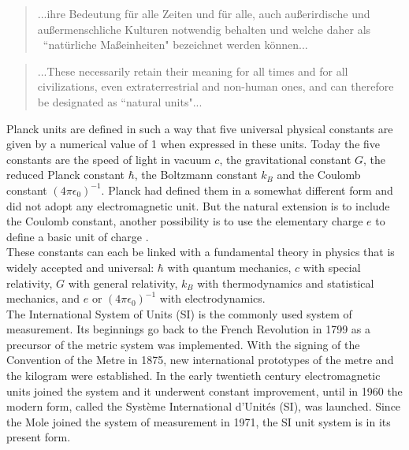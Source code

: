 \documentclass[prb,preprint]{revtex4-1}
\begin{document}
\begin{quote} ...ihre Bedeutung f\"{u}r alle Zeiten und f\"{u}r alle, auch au{\ss}erirdische und au{\ss}ermenschliche Kulturen notwendig behalten und welche daher als  ``nat\"{u}rliche Ma{\ss}einheiten" bezeichnet werden k\"{o}nnen... \end{quote}

\begin{quote} ...These necessarily retain their meaning for all times and for all civilizations, even extraterrestrial and non-human ones, and can therefore be designated as ``natural units"... \end{quote}

Planck units are defined in such a way that five universal physical constants are given by a numerical value of 1 when expressed in these units. Today the five constants are the speed of light in vacuum $c$, the gravitational constant $G$, the reduced Planck constant $\hbar$, the Boltzmann constant $k_B$ and the Coulomb constant $\left(4 \pi \epsilon_0\right)^{-1}$. Planck had defined them in a somewhat different form and did not adopt any electromagnetic unit. But the natural extension is to include the Coulomb constant, another possibility is to use the elementary charge $e$ to define a basic unit of charge \cite{Tomilin99}.\\
These constants can each be linked with a fundamental theory in physics that is widely accepted and universal: $\hbar$ with quantum mechanics, $c$ with special relativity, $G$ with general relativity, $k_B$ with thermodynamics and statistical mechanics, and $e$ or $\left(4 \pi \epsilon_0\right)^{-1}$ with electrodynamics.\\



The International System of Units (SI) is the commonly used system of measurement. Its beginnings go back to the French Revolution in 1799 as a precursor of the metric system was implemented. With the signing of the Convention of the Metre in 1875, new international prototypes of the metre and the kilogram were established. In the early twentieth century electromagnetic units joined the system and it underwent constant improvement, until in 1960 the modern form, called the Système International d'Unités (SI), was launched. Since the Mole joined the system of measurement in 1971, the SI unit system is in its present form.\\
\end{document}
